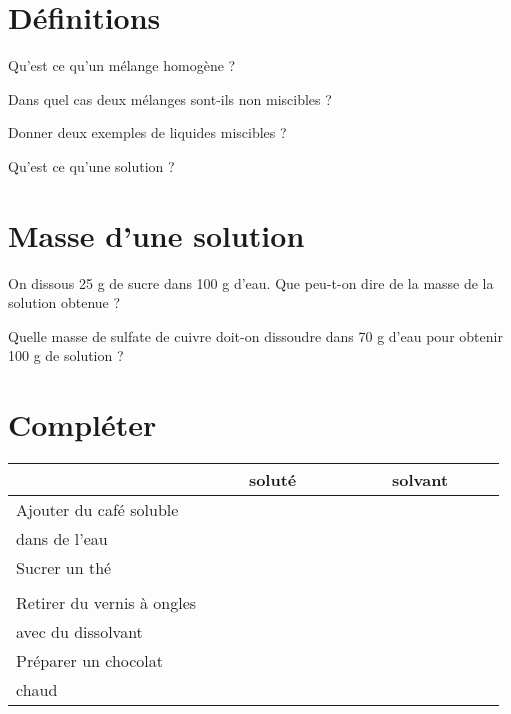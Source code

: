 \section{Définitions}

\begin{questions}
	\question Qu'est ce qu'un mélange homogène ?
	\fillwithdottedlines{2cm}
	
	\question Dans quel cas deux mélanges sont-ils non miscibles ?
	\fillwithdottedlines{2cm}
	
	
	\question Donner deux exemples de liquides miscibles ?
	\fillwithdottedlines{3cm}
	
	\question Qu'est ce qu'une solution ?
	\fillwithdottedlines{2cm}
	
\end{questions}

\section{Masse d'une solution}

\begin{questions}
	\question On dissous 25 g de sucre dans 100 g d'eau. Que peu-t-on dire de la masse de la solution obtenue ?
	\fillwithdottedlines{2cm}
	
	\question Quelle masse de sulfate de cuivre doit-on dissoudre dans 70 g d'eau pour obtenir 100 g de solution ?
	\fillwithdottedlines{2cm}
	
\end{questions}

\section{Compléter}
\begin{center}
		
	\begin{tabular}{|@{\ }l@{\ }|c|c|}
		\hline
		& \ \ \ \ soluté \ \ \ \ & \ \ \ \  solvant \ \ \ \  \\ \hline
		Ajouter du café soluble    &        &         \\ %
		dans de l'eau              &        &         \\ \hline
		Sucrer un thé              &        &         \\ %
		&        &         \\ \hline
		Retirer du vernis à ongles &        &         \\ %
		avec du dissolvant         &        &         \\ \hline
		Préparer un chocolat       &        &         \\ %
		chaud                      &        &         \\ \hline
	\end{tabular}
\end{center}